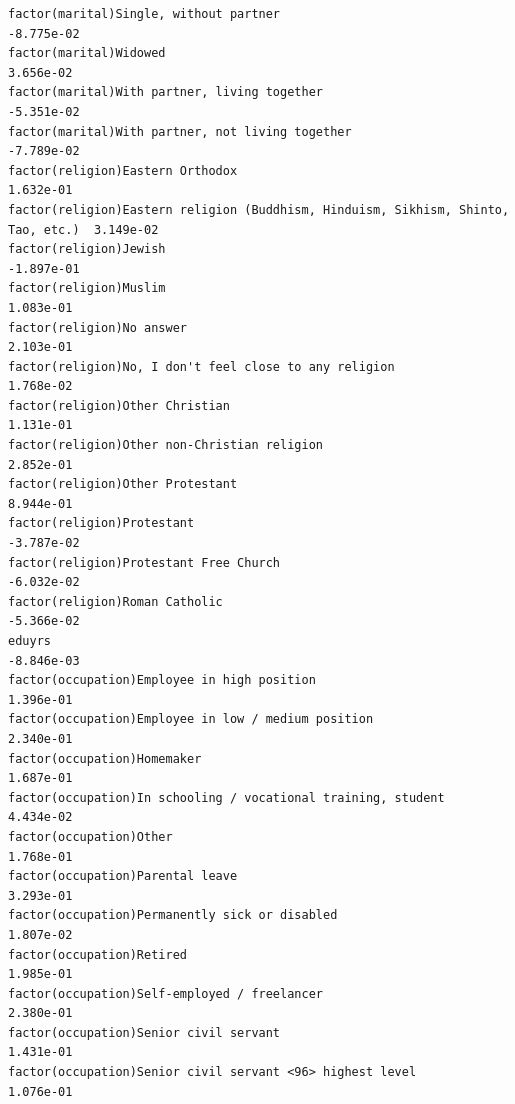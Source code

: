 \documentclass[
]{article}
\begin{document}
\begin{table}
\begin{minipage}[t]{\linewidth}
{\begin{verbatim}
factor(marital)Single, without partner                                            -8.775e-02
factor(marital)Widowed                                                             3.656e-02
factor(marital)With partner, living together                                      -5.351e-02
factor(marital)With partner, not living together                                  -7.789e-02
factor(religion)Eastern Orthodox                                                   1.632e-01
factor(religion)Eastern religion (Buddhism, Hinduism, Sikhism, Shinto, Tao, etc.)  3.149e-02
factor(religion)Jewish                                                            -1.897e-01
factor(religion)Muslim                                                             1.083e-01
factor(religion)No answer                                                          2.103e-01
factor(religion)No, I don't feel close to any religion                             1.768e-02
factor(religion)Other Christian                                                    1.131e-01
factor(religion)Other non-Christian religion                                       2.852e-01
factor(religion)Other Protestant                                                   8.944e-01
factor(religion)Protestant                                                        -3.787e-02
factor(religion)Protestant Free Church                                            -6.032e-02
factor(religion)Roman Catholic                                                    -5.366e-02
eduyrs                                                                            -8.846e-03
factor(occupation)Employee in high position                                        1.396e-01
factor(occupation)Employee in low / medium position                                2.340e-01
factor(occupation)Homemaker                                                        1.687e-01
factor(occupation)In schooling / vocational training, student                      4.434e-02
factor(occupation)Other                                                            1.768e-01
factor(occupation)Parental leave                                                   3.293e-01
factor(occupation)Permanently sick or disabled                                     1.807e-02
factor(occupation)Retired                                                          1.985e-01
factor(occupation)Self-employed / freelancer                                       2.380e-01
factor(occupation)Senior civil servant                                             1.431e-01
factor(occupation)Senior civil servant <96> highest level                          1.076e-01

\end{verbatim}}
\end{minipage}
\end{table}
\end{document}
